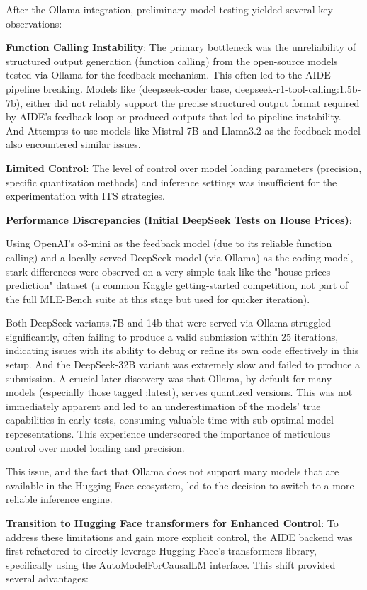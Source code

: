 After the Ollama integration, preliminary model testing yielded several key observations:

\textbf{Function Calling Instability}: The primary bottleneck was the unreliability of structured output generation (function calling) from the open-source models tested via Ollama for the feedback mechanism. This often led to the AIDE pipeline breaking.
Models like (deepseek-coder base, deepseek-r1-tool-calling:1.5b-7b), either did not reliably support the precise structured output format required by AIDE's feedback loop or produced outputs that led to pipeline instability. And Attempts to use models like Mistral-7B and Llama3.2 as the feedback model also encountered similar issues.

\textbf{Limited Control}: The level of control over model loading parameters (precision, specific quantization methods) and inference settings was insufficient for the experimentation with ITS strategies.

\textbf{Performance Discrepancies (Initial DeepSeek Tests on House Prices)}:

Using OpenAI's o3-mini as the feedback model (due to its reliable function calling) and a locally served DeepSeek model (via Ollama) as the coding model, stark differences were observed on a very simple task like the "house prices prediction" dataset (a common Kaggle getting-started competition, not part of the full MLE-Bench suite at this stage but used for quicker iteration).

Both DeepSeek variants,7B and 14b that were served via Ollama struggled significantly, often failing to produce a valid submission within 25 iterations, indicating issues with its ability to debug or refine its own code effectively in this setup. And the DeepSeek-32B variant was extremely slow and failed to produce a submission. A crucial later discovery was that Ollama, by default for many models (especially those tagged :latest), serves quantized versions. This was not immediately apparent and led to an underestimation of the models' true capabilities in early tests, consuming valuable time with sub-optimal model representations. This experience underscored the importance of meticulous control over model loading and precision.

This issue, and the fact that Ollama does not support many models that are available in the Hugging Face ecosystem, led to the decision to switch to a more reliable inference engine.


\textbf{Transition to Hugging Face transformers for Enhanced Control}:
To address these limitations and gain more explicit control, the AIDE backend was first refactored to directly leverage Hugging Face's transformers library, specifically using the AutoModelForCausalLM interface. This shift provided several advantages:

